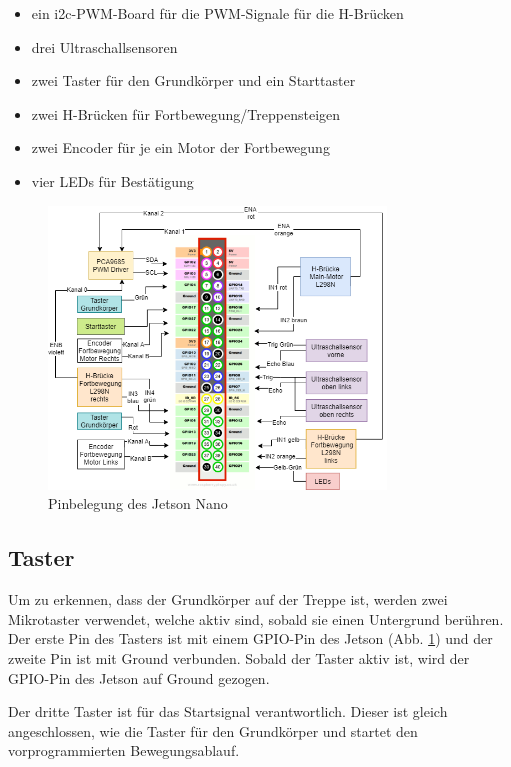 \begin{itemize}
    \item ein \acrshort{i2c}-PWM-Board für die PWM-Signale für die H-Brücken 
    \item drei Ultraschallsensoren
    \item zwei Taster für den Grundkörper und ein Starttaster
    \item zwei H-Brücken für Fortbewegung/Treppensteigen
    \item zwei Encoder für je ein Motor der Fortbewegung
    \item vier LEDs für Bestätigung
\end{itemize} 

\begin{figure}[H]
  \includegraphics[width=0.8\textwidth]{img/Elektronik/pinout.png}
  \centering
  \caption{Pinbelegung des Jetson Nano}
  \label{fig:pinout-jetson}
\end{figure}


\newpage

\subsection{Taster}

Um zu erkennen, dass der Grundkörper auf der Treppe ist, werden zwei Mikrotaster verwendet, welche aktiv sind, sobald sie einen Untergrund berühren. Der erste Pin des Tasters ist mit einem GPIO-Pin des Jetson (Abb. \ref{fig:pinout-jetson}) und der zweite Pin ist mit Ground verbunden. Sobald der Taster aktiv ist, wird der GPIO-Pin des Jetson auf Ground gezogen. 

Der dritte Taster ist für das Startsignal verantwortlich. Dieser ist gleich angeschlossen, wie die Taster für den Grundkörper und startet den vorprogrammierten Bewegungsablauf.

